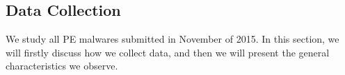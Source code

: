 


\subsection{Data Collection}
\label{sec:meth}


We study all PE malwares submitted in November of 2015. 
In this section, we will firstly discuss how we collect data, 
and then we will present the general characteristics we observe.


